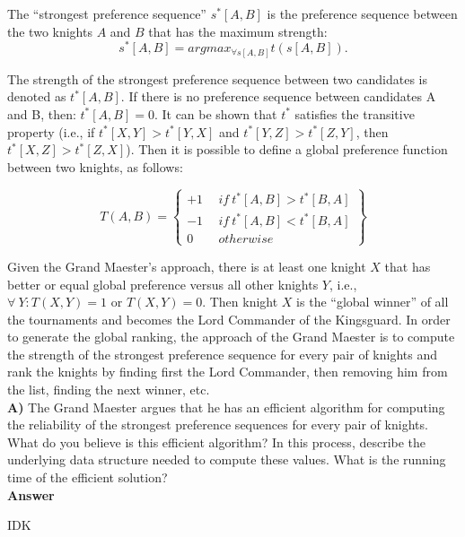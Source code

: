 \documentclass{article}
\begin{document}
\noindent The ``strongest preference sequence'' $s^*[A,B]$ is the
preference sequence between the two knights $A$ and $B$ that has the
maximum strength:
$$s^*[A,B] = argmax_{\forall s[A,B]} t( s[A,B] ).$$ 

\noindent The strength of the strongest preference sequence between
two candidates is denoted as $t^*[A,B]$. If there is no preference
sequence between candidates A and B, then: $t^*[A,B] = 0$. It can be
shown that $t^*$ satisfies the transitive property (i.e., if $t^*[X,Y]
> t^*[Y,X]$ and $t^*[Y,Z] > t^*[Z,Y]$, then $t^*[X,Z] >
t^*[Z,X]$). Then it is possible to define a global preference function
between two knights, as follows:\vspace{-.2in}

\begin{equation*}
T(A,B)=\left\{
\begin{matrix}+1\ &\ if\ t^*[A,B]>t^*[B,A]\\
-1\ &\ if\ t^*[A,B]<t^*[B,A]\\
0\ &\ otherwise
\end{matrix}
\right\}
\end{equation*}

\noindent Given the Grand Maester's approach, there is at least one
knight $X$ that has better or equal global preference versus all other
knights $Y$, i.e., $\forall\ Y: T(X,Y) = 1$ or $T(X,Y)=0$. Then knight
$X$ is the ``global winner'' of all the tournaments and becomes the
Lord Commander of the Kingsguard.  In order to generate the global
ranking, the approach of the Grand Maester is to compute the strength
of the strongest preference sequence for every pair of knights and
rank the knights by finding first the Lord Commander, then removing
him from the list, finding the next winner, etc.\\

\noindent \textbf{A)} The Grand Maester argues that he has an
efficient algorithm for computing the reliability of the strongest
preference sequences for every pair of knights. What do you believe is
this efficient algorithm? In this process, describe the underlying
data structure needed to compute these values. What is the running
time of the efficient solution?\\

\textbf{ Answer }
\vspace{0.1in}
\begin{adjustwidth}{1.8em}{0pt}
IDK
\end{adjustwidth}
\end{document}

